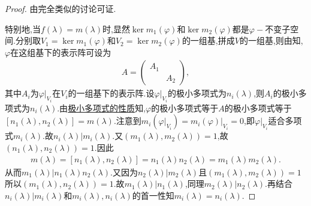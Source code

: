 \documentclass[../../main.tex]{subfiles}%
\begin{document}
\begin{proof}

由完全类似的讨论可证.

特别地,当$f(\lambda)=m(\lambda)$时,显然$\ker m_1\left( \varphi \right)$和$\ker m_2\left( \varphi \right)$都是$\varphi-$不变子空间.分别取$V_1=\ker m_1\left( \varphi \right)$和$V_2=\ker m_2\left( \varphi \right)$的一组基,拼成$V$的一组基,则由知,$\varphi$在这组基下的表示阵可设为
\begin{align*}
A=\begin{pmatrix}
A_1&		\\
&		A_2
\end{pmatrix},
\end{align*}
其中$A_i$为$\varphi |_{V_i}$在$V_i$的一组基下的表示阵.设$\varphi |_{V_i}$的极小多项式为$n_i\left( \lambda \right)$,则$A_i$的极小多项式为$n_i\left( \lambda \right)$.由\hyperref[proposition:极小多项式的性质]{极小多项式的性质}知,$\varphi$的极小多项式等于$A$的极小多项式等于$\left[ n_1\left( \lambda \right) ,n_2\left( \lambda \right) \right] =m\left( \lambda \right)$.注意到$m_i\left( \varphi |_{V_i} \right) =m_i\left( \varphi \right) |_{V_i}=0$,即$\varphi |_{V_i}$适合多项式$m_i\left( \lambda \right)$.故$n_i\left( \lambda \right) |m_i\left( \lambda \right)$.又$\left( m_1\left( \lambda \right) ,m_2\left( \lambda \right) \right) =1$,故$\left( n_1\left( \lambda \right) ,n_2\left( \lambda \right) \right) =1$.因此
\begin{align*}
m\left( \lambda \right) =\left[ n_1\left( \lambda \right) ,n_2\left( \lambda \right) \right] =n_1\left( \lambda \right) n_2\left( \lambda \right) =m_1\left( \lambda \right) m_2\left( \lambda \right).
\end{align*}
从而$m_1\left( \lambda \right) |n_1\left( \lambda \right) n_2\left( \lambda \right)$.又因为$n_2\left( \lambda \right) |m_2\left( \lambda \right)$且$\left( m_1\left( \lambda \right) ,m_2\left( \lambda \right) \right) =1$所以$\left( m_1\left( \lambda \right) ,n_2\left( \lambda \right) \right) =1$.故$m_1\left( \lambda \right) |n_1\left( \lambda \right)$,同理$m_2\left( \lambda \right) |n_2\left( \lambda \right)$.再结合$n_i\left( \lambda \right) |m_i\left( \lambda \right)$和$m_i\left( \lambda \right),n_i\left( \lambda \right)$的首一性知$m_i\left( \lambda \right) =n_i\left( \lambda \right)$.

\end{proof}
\end{document}
